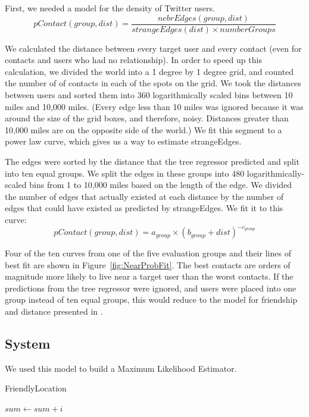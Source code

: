 First, we needed a model for the density of Twitter users.
\[
    pContact(group,dist) = \frac{nebrEdges(group,dist)}{strangeEdges(dist) \times numberGroups}
\]

We calculated the distance between every target user and every contact
(even for contacts and users who had no relationship).
%
In order to speed up this calculation, we divided the world into a \.1 degree
by \.1 degree grid, and counted the number of of contacts in each of the spots
on the grid.
%
We took the distances between users and sorted them into 360 logarithmically
scaled bins between 10 miles and 10,000 miles.
%
(Every edge less than 10 miles was ignored because it was around the size of
the grid boxes, and therefore, noisy. Distances greater than 10,000 miles are
on the opposite side of the world.)
%
We fit this segment to a power law curve, which gives us a way to estimate
strangeEdges.

The edges were sorted by the distance that the tree regressor predicted and
split into ten equal groups.
%
We split the edges in these groups into 480 logarithmically-scaled bins from 1
to 10,000 miles based on the length of the edge.
%
We divided the number of edges that actually existed at each distance by the
number of edges that could have existed as predicted by strangeEdges.
%
We fit it to this curve:
%
\[
pContact(group, dist) = a_{group} \times (b_{group}+dist)^{-c_{group}}
\]

Four of the ten curves from one of the five evaluation groups and their lines
of best fit are shown in Figure~\ref{fig:NearProbFit}.
%
The best contacts are orders of magnitude more
likely to live near a target user than the worst contacts.
%
If the predictions from the tree regressor were ignored, and users were placed
into one group instead of ten equal groups, this would reduce to the model
for friendship and distance presented in \cite{backstrom2010find}.


\subsection{System}
We used this model to build a Maximum Likelihood Estimator.


\begin{algorithm}
  \caption{FriendlyLocation \label{alg:friendloc}}
  \begin{algorithmic}[0]
   \State $sum\gets sum+i$
  \EndFor
  \end{algorithmic}
\end{algorithm}

